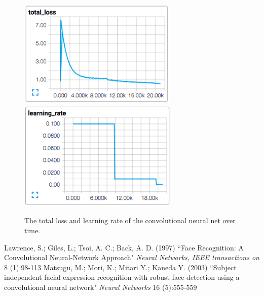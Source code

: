 \documentclass[11pt, twocolumn, twoside]{article}
\begin{document}
\begin{figure}
	\centering
	\includegraphics[width=3in]{total_loss}
	\includegraphics[width=3in]{learning_rate}
	\caption{The total loss and learning rate of the convolutional neural net over time.}
	\label{fig:cnnloss}
\end{figure}


\begin{thebibliography}{9}
Lawrence, S.; Giles, L.; Tsoi, A. C.; Back, A. D. (1997)
``Face Recognition: A Convolutional Neural-Network Approach"
\textit{Neural Networks, IEEE transactions on} 8 (1):98-113
Matsugu, M.; Mori, K.; Mitari Y.; Kaneda Y. (2003)
``Subject independent facial expression recognition with robust face detection using a convolutional neural network"
\textit{Neural Networks} 16 (5):555-559
\end{thebibliography}
\end{document}
